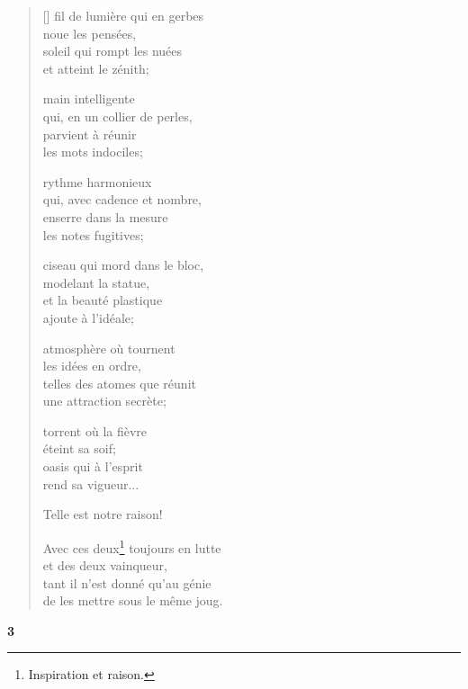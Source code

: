 \documentclass[a4paper,12pt]{book}
\begin{document}
\begin{verse}[\versewidth]
  fil de lumière qui en gerbes \\
  noue les pensées, \\
  soleil qui rompt les nuées \\
  et atteint le zénith;

  main intelligente \\
  qui, en un collier de perles, \\
  parvient à réunir \\
  les mots indociles;

  rythme harmonieux \\
  qui, avec cadence et nombre, \\
  enserre dans la mesure \\
  les notes fugitives;

  ciseau qui mord dans le bloc, \\
  modelant la statue, \\
  et la beauté plastique \\
  ajoute à l'idéale;

  atmosphère où tournent \\
  les idées en ordre, \\
  telles des atomes que réunit \\
  une attraction secrète;

  torrent où la fièvre \\
  éteint sa soif; \\
  oasis qui à l'esprit \\
  rend sa vigueur...

  Telle est notre raison!

  Avec ces deux\footnote{Inspiration et raison.} toujours en lutte \\
  et des deux vainqueur, \\
  tant il n'est donné qu'au génie \\
  de les mettre sous le même joug.
\end{verse}

\bigskip

\begin{center}
  \textbf{3}
\end{center}

\settowidth{\versewidth}{tant qu'il existera une femme splendide,}
\end{document}
